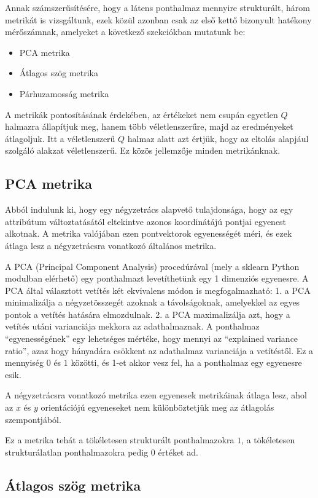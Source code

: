 Annak számszerűsítésére, hogy a látens ponthalmaz mennyire strukturált, három metrikát is vizsgáltunk, ezek közül azonban csak az első kettő bizonyult hatékony mérőszámnak, amelyeket a következő szekciókban mutatunk be:
\begin{itemize}
  \item PCA metrika
  \item Átlagos szög metrika
  \item Párhuzamosság metrika
\end{itemize}

A metrikák pontosításának érdekében, az értékeket nem csupán egyetlen $Q$ halmazra állapítjuk meg, hanem több véletlenszerűre,   majd az eredményeket átlagoljuk. Itt a véletlenszerű $Q$ halmaz alatt azt értjük, hogy az eltolás alapjául szolgáló alakzat véletlenszerű. Ez közös jellemzője minden metrikánknak.

\subsection{PCA metrika}

Abból indulunk ki, hogy egy négyzetrács alapvető tulajdonsága, hogy az egy attribútum változtatásától eltekintve azonos koordinátájú pontjai egyenest alkotnak.  A metrika valójában ezen pontvektorok egyenességét méri, és ezek átlaga lesz a négyzetrácsra vonatkozó általános metrika.

A PCA (Principal Component Analysis) procedúrával (mely a sklearn Python modulban elérhető) egy ponthalmazt levetíthetünk egy 1 dimenziós egyenesre. A PCA által választott vetítés két ekvivalens módon is megfogalmazható: 1. a PCA minimalizálja a négyzetösszegét azoknak a távolságoknak, amelyekkel az egyes pontok a vetítés hatására elmozdulnak. 2. a PCA maximalizálja azt, hogy a vetítés utáni varianciája mekkora az adathalmaznak. A ponthalmaz “egyenességének” egy lehetséges mértéke, hogy mennyi az “explained variance ratio”, azaz hogy hányadára csökkent az adathalmaz varianciája a vetítéstől. Ez a mennyiség $0$ és $1$ közötti, és 1-et akkor vesz fel, ha a ponthalmaz egy egyenesre esik.

A négyzetrácsra vonatkozó metrika ezen egyenesek metrikáinak átlaga lesz, ahol az $x$ és $y$ orientációjú egyeneseket nem különböztetjük meg az átlagolás szempontjából.

Ez a metrika tehát a tökéletesen strukturált ponthalmazokra $1$, a tökéletesen strukturálatlan ponthalmazokra pedig $0$ értéket ad.

\subsection{Átlagos szög metrika}

